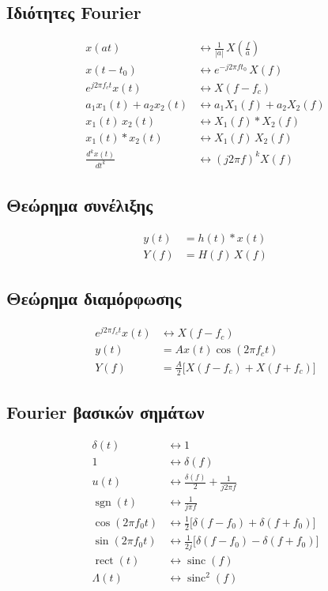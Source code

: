 \documentclass[11pt,a4paper]{article}
\newcommand{\rect}{\operatorname{rect}}
\newcommand{\sinc}{\operatorname{sinc}}
\newcommand{\sgn}{\operatorname{sgn}}
\begin{document}
\subsection{Ιδιότητες Fourier}
\begin{align}
x(at) &\longleftrightarrow \frac{1}{|a|}\,X\!\left(\frac{f}{a}\right) \\
x(t-t_0) &\longleftrightarrow e^{-j2\pi f t_0}\,X(f) \\
e^{j2\pi f_c t}x(t) &\longleftrightarrow X(f - f_c) \\
a_1 x_1(t) + a_2 x_2(t) &\longleftrightarrow a_1 X_1(f) + a_2 X_2(f) \\
x_1(t)\,x_2(t) &\longleftrightarrow X_1(f) \ast X_2(f) \\
x_1(t) \ast x_2(t) &\longleftrightarrow X_1(f)\,X_2(f) \\
\frac{d^k x(t)}{dt^k} &\longleftrightarrow (j2\pi f)^k X(f)
\end{align}

\subsection{Θεώρημα συνέλιξης}
\begin{align}
y(t) &= h(t) \ast x(t) \\
Y(f) &= H(f)\,X(f)
\end{align}

\subsection{Θεώρημα διαμόρφωσης}
\begin{align}
e^{j2\pi f_c t}x(t) &\longleftrightarrow X(f - f_c) \\
y(t) &= A x(t)\cos(2\pi f_c t) \\
Y(f) &= \frac{A}{2}\bigl[X(f-f_c) + X(f+f_c)\bigr]
\end{align}

\subsection{Fourier βασικών σημάτων}
\begin{align}
\delta(t) &\longleftrightarrow 1 \\
1 &\longleftrightarrow \delta(f) \\
u(t) &\longleftrightarrow \frac{\delta(f)}{2} + \frac{1}{j2\pi f} \\
\sgn(t) &\longleftrightarrow \frac{1}{j\pi f} \\
\cos(2\pi f_0 t) &\longleftrightarrow \frac{1}{2}\bigl[\delta(f-f_0)+\delta(f+f_0)\bigr] \\
\sin(2\pi f_0 t) &\longleftrightarrow \frac{1}{2j}\bigl[\delta(f-f_0)-\delta(f+f_0)\bigr] \\
\rect(t) &\longleftrightarrow \sinc(f) \\
\Lambda(t) &\longleftrightarrow \sinc^2(f)
\end{align}
\end{document}
